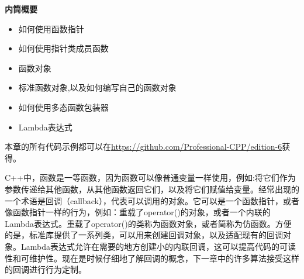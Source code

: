 \noindent
\textbf{内筒概要}

\begin{itemize}
\item
如何使用函数指针

\item
如何使用指针类成员函数

\item
函数对象

\item
标准函数对象,以及如何编写自己的函数对象

\item
如何使用多态函数包装器

\item
Lambda表达式
\end{itemize}

本章的所有代码示例都可以在\url{https://github.com/Professional-CPP/edition-6}获得。

C++中，函数是一等函数，因为函数可以像普通变量一样使用，例如:将它们作为参数传递给其他函数，从其他函数返回它们，以及将它们赋值给变量。经常出现的一个术语是回调（callback），代表可以调用的对象。它可以是一个函数指针，或者像函数指针一样的行为，例如：重载了operator()的对象，或者一个内联的Lambda表达式。重载了operator()的类称为函数对象，或者简称为仿函数。方便的是，标准库提供了一系列类，可以用来创建回调对象，以及适配现有的回调对象。Lambda表达式允许在需要的地方创建小的内联回调，这可以提高代码的可读性和可维护性。现在是时候仔细地了解回调的概念，下一章中的许多算法接受这样的回调进行行为定制。
